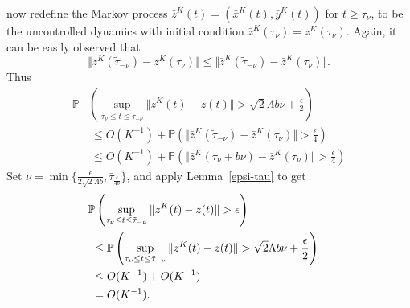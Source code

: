\documentclass[10pt,journal,letterpaper]{IEEEtran}
\newcommand{\remove}[1]{}
\begin{document}
\begin{inparaenum}[(a)]
now redefine the Markov process $\bar{z}^K(t) =
(\bar{x}^K(t),\bar{y}^K(t))$ for $t \geq \tau_{\nu}$, to be the
uncontrolled dynamics with initial condition $\bar{z}^K(\tau_{\nu})
= z^K(\tau_{\nu})$. Again, it can be easily observed that
\[\Vert z^K(\tilde{\tau}_{-\nu})-
z^K(\tau_{\nu}) \Vert \leq \Vert \bar{z}^K(\tilde{\tau}_{-\nu})-
\bar{z}^K(\tau_{\nu}) \Vert. \]
 Thus
\begin{align*}
\mathbb{P}& \left(\sup_{\tau_{\nu} \leq t \leq \tilde{\tau}_{-\nu}}
 \Vert z^K(t)- z(t) \Vert > \sqrt{2}\Lambda
b\nu + \frac{\epsilon}{2} \right) \\
&~\leq O(K^{-1}) + \mathbb{P}\left(\Vert \bar{z}^K(\tilde{\tau}_{-\nu})-
\bar{z}^K(\tau_{\nu}) \Vert > \frac{\epsilon}{4} \right)\\
&~ \leq O(K^{-1}) + \mathbb{P}\left(\Vert
\bar{z}^K(\tau_{\nu} + b\nu)- \bar{z}^K(\tau_{\nu}) \Vert >
\frac{\epsilon}{4} \right)
\end{align*}
Set $\nu = \min\{\frac{\epsilon}{2\sqrt{2}\Lambda
b},\bar{\tau}_{\frac{\epsilon}{4b}}\}$, and apply Lemma~\ref{epsi-tau} to get
\begin{align*}
\lefteqn{\mathbb{P} \left(\sup_{\tau_{\nu} \leq t \leq
\tilde{\tau}_{-\nu}}
 \Vert z^K(t)- z(t) \Vert > \epsilon \right)} \\
&~ \leq \mathbb{P}\left(\sup_{\tau_{\nu} \leq t \leq
\tilde{\tau}_{-\nu}}
 \Vert z^K(t)- z(t) \Vert > \sqrt{2}\Lambda
b\nu + \frac{\epsilon}{2} \right) \\
&~ \leq O(K^{-1}) + O(K^{-1}) \\
&~=O(K^{-1}).
\end{align*}

\remove{

Observe that
\begin{align*}
\sup_{\tau_{\nu} \leq t \leq \bar{\tau}_{-\nu}} \left( z(t) - z^K(t)\right) &~\leq z(\bar{\tau}_{-\nu})- z^K(\tau_{\nu})\\
&~ \leq_{so} \bar{z}(\bar{\tau}_{-\nu})- \bar{z}^K(\tau_{\nu}).
\end{align*}
Thus,
\begin{align*}
\mathbb{P}\left(\sup_{\tau_{\nu} \leq t \leq \bar{\tau}_{-\nu}} \left(
 z(t) - z^K(t)\right) > \epsilon \right) &~ \leq \mathbb{P}\left(\bar{z}(\bar{\tau}_{-\nu})- \bar{z}^K(\tau_{\nu})  > \epsilon \right) \\
&~ = O(K^{-1}).
\end{align*}
The last equality can be easily seen to be true. Similarly, it can be shown that
\[
\mathbb{P}\left(\sup_{\tau_{\nu} \leq t \leq \bar{\tau}_{-\nu}} \left(
 z^K(t) - z(t)\right) > \epsilon \right) = O(K^{-1}).
\]

}
\end{inparaenum}
\end{document}
